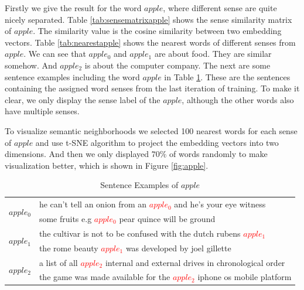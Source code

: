 Firstly we give the result for the word $apple$, where different sense are quite nicely separated. Table \ref{tab:sensematrixapple} shows the sense similarity matrix of $apple$. The similarity value is the cosine similarity between two embedding vectors. Table \ref{tab:nearestapple} shows the nearest words of different senses from $apple$. We can see that $apple_0$ and $apple_1$ are about food. They are similar somehow. And $apple_2$ is about the computer company. The next are some sentence examples including the word $apple$ in Table \ref{tab:sentenceapple}. These are the sentences containing the assigned word senses from the last iteration of training. To make it clear, we only display the sense label of the $apple$, although the other words also have multiple senses.

To visualize semantic neighborhoods we selected 100 nearest words for each sense of $apple$ and use t-SNE algorithm \citep{MaatenHinton2008} to project the embedding vectors into two dimensions. And then we only displayed $70\%$ of words randomly to make visualization better, which is shown in Figure \ref{fig:apple}. 
 


\begin{table}[tb]

\caption{Sentence Examples of $apple$} \label{tab:sentenceapple} 
\begin{center} 
\begin{tabular}{|l|l|}
\hline
\multirow{2}{*}{$apple_0$} 
&he can't tell an onion from an \textcolor{red}{$apple_0$} and he's your eye witness\\
&some fruits e.g \textcolor{red}{$apple_0$} pear quince will be ground\\
\hline
\multirow{2}{*}{$apple_1$} 
&the cultivar is not to be confused with the dutch rubens \textcolor{red}{$apple_1$}\\
&the rome beauty \textcolor{red}{$apple_1$} was developed by joel gillette \\
\hline
\multirow{2}{*}{$apple_2$} 
&a list of all \textcolor{red}{$apple_2$} internal and external drives in chronological order\\
&the game was made available for the \textcolor{red}{$apple_2$} iphone os mobile platform\\
\hline
\end{tabular} 
\end{center}
\end{table}


